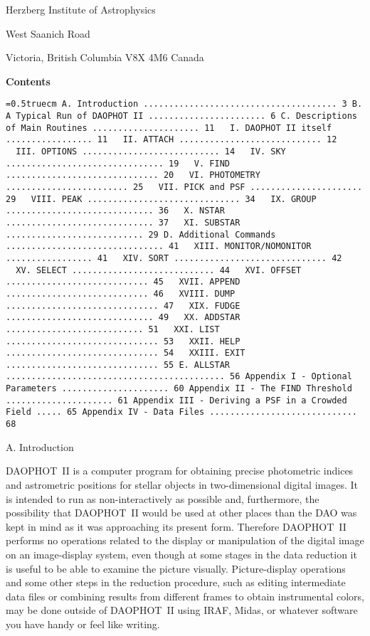 \indent Herzberg Institute of Astrophysics

 West Saanich Road

\indent Victoria, British Columbia V8X 4M6
\medskip
\indent Canada
\vfill
\eject
\centerline{\bf Contents}
\bigskip
{\noindent\obeylines\obeyspaces\frenchspacing\tt\baselineskip=0.5truecm
A. Introduction ......................................  3
B. A Typical Run of DAOPHOT~II .......................  6
C. Descriptions of Main Routines ..................... 11
\ \   I.     DAOPHOT~II itself ................. 11
\ \   II.    ATTACH ............................ 12
\ \   III.   OPTIONS ........................... 14
\ \   IV.    SKY ............................... 19
\ \   V.     FIND .............................. 20
\ \   VI.    PHOTOMETRY ........................ 25
\ \   VII.   PICK and PSF ...................... 29
\ \   VIII.  PEAK .............................. 34
\ \   IX.    GROUP ............................. 36
\ \   X.     NSTAR ............................. 37
\ \   XI.    SUBSTAR ........................... 29
D. Additional Commands ............................... 41
\ \   XIII.  MONITOR/NOMONITOR ................. 41
\ \   XIV.   SORT .............................. 42
\ \   XV.    SELECT ............................ 44
\ \   XVI.   OFFSET ............................ 45
\ \   XVII.  APPEND ............................ 46
\ \   XVIII. DUMP .............................. 47
\ \   XIX.   FUDGE ............................. 49
\ \   XX.    ADDSTAR ........................... 51
\ \   XXI.   LIST .............................. 53
\ \   XXII.  HELP .............................. 54
\ \   XXIII. EXIT .............................. 55
E. ALLSTAR ........................................... 56
Appendix I - Optional Parameters ..................... 60
Appendix II - The FIND Threshold ..................... 61
Appendix III - Deriving a PSF in a Crowded Field ..... 65
Appendix IV - Data Files ............................. 68
}
\vfill
\eject
\centerline{A.  Introduction}

DAOPHOT~II is a computer program for obtaining precise photometric
indices and astrometric positions for stellar objects in
two-dimensional digital images. It is intended to run as
non-interactively as possible and, furthermore, the possibility that
DAOPHOT~II would be used at other places than the DAO was kept in mind
as it was approaching its present form.  Therefore DAOPHOT~II performs
no operations related to the display or manipulation of the digital
image on an image-display system, even though at some stages in the
data reduction it is useful to be able to examine the picture
visually. Picture-display operations and some other steps in the
reduction procedure, such as editing intermediate data files or
combining results from different frames to obtain instrumental colors,
may be done outside of DAOPHOT~II using IRAF, Midas, or whatever
software you have handy or feel like writing.

